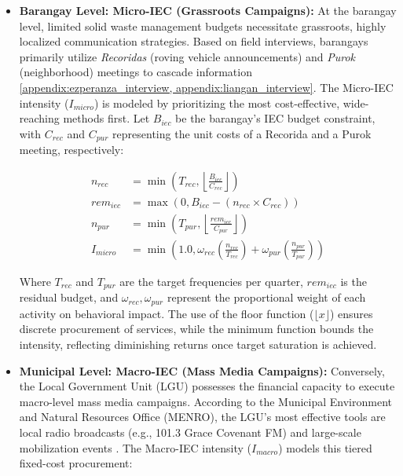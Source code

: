 \begin{itemize}
    \item \textbf{Barangay Level: Micro-IEC (Grassroots Campaigns):} 
    At the barangay level, limited solid waste management budgets necessitate grassroots, highly localized communication strategies. Based on field interviews, barangays primarily utilize \textit{Recoridas} (roving vehicle announcements) and \textit{Purok} (neighborhood) meetings to cascade information \ref{appendix:ezperanza_interview, appendix:liangan_interview}. The Micro-IEC intensity ($I_{micro}$) is modeled by prioritizing the most cost-effective, wide-reaching methods first. Let $B_{iec}$ be the barangay's IEC budget constraint, with $C_{rec}$ and $C_{pur}$ representing the unit costs of a Recorida and a Purok meeting, respectively:

\begin{align}
    n_{rec} &= \min \left( T_{rec}, \left\lfloor \frac{B_{iec}}{C_{rec}} \right\rfloor \right) \label{eq:micro_recorida} \\
    rem_{iec} &= \max \left( 0, B_{iec} - (n_{rec} \times C_{rec}) \right) \label{eq:micro_rem} \\
    n_{pur} &= \min \left( T_{pur}, \left\lfloor \frac{rem_{iec}}{C_{pur}} \right\rfloor \right) \label{eq:micro_purok} \\
    I_{micro} &= \min \left( 1.0, \omega_{rec} \left( \frac{n_{rec}}{T_{rec}} \right) + \omega_{pur} \left( \frac{n_{pur}}{T_{pur}} \right) \right) \label{eq:micro_intensity}
\end{align}

    Where $T_{rec}$ and $T_{pur}$ are the target frequencies per quarter, $rem_{iec}$ is the residual budget, and $\omega_{rec}, \omega_{pur}$ represent the proportional weight of each activity on behavioral impact. The use of the floor function ($\lfloor x \rfloor$) ensures discrete procurement of services, while the minimum function bounds the intensity, reflecting diminishing returns once target saturation is achieved.

    \item \textbf{Municipal Level: Macro-IEC (Mass Media Campaigns):} 
    Conversely, the Local Government Unit (LGU) possesses the financial capacity to execute macro-level mass media campaigns. According to the Municipal Environment and Natural Resources Office (MENRO), the LGU's most effective tools are local radio broadcasts (e.g., 101.3 Grace Covenant FM) and large-scale mobilization events \citep{appendix:menro_interview}. The Macro-IEC intensity ($I_{macro}$) models this tiered fixed-cost procurement:


\end{itemize}

